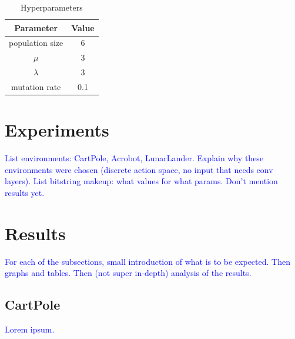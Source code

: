 \documentclass{article}
\newcommand{\TODO}[1]{\textcolor{blue}{#1}}
\begin{document}
\begin{table}[htbp]
    \centering
    \begin{tabular}
        {|c|c|}
        \toprule
        \textbf{Parameter} & \textbf{Value} \\
        \midrule
        population size & 6 \\
        $\mu$           & 3 \\
        $\lambda$       & 3 \\
        mutation rate   & 0.1 \\
        \bottomrule
    \end{tabular}
    \caption{Hyperparameters}
    \label{tab:hyper}
\end{table}

\section{Experiments}
\label{sec:exp}

\TODO{
    List environments: CartPole, Acrobot, LunarLander.
    Explain why these environments were chosen (discrete action space, no input that needs conv layers).
    List bitstring makeup: what values for what params.
    Don't mention results yet.
}

\section{Results}
\label{sec:res}

\TODO{
    For each of the subsections, small introduction of what is to be expected.
    Then graphs and tables.
    Then (not super in-depth) analysis of the results.
}

\subsection{CartPole}
\label{ssec:cp}

\TODO{Lorem ipsum.}
\end{document}
